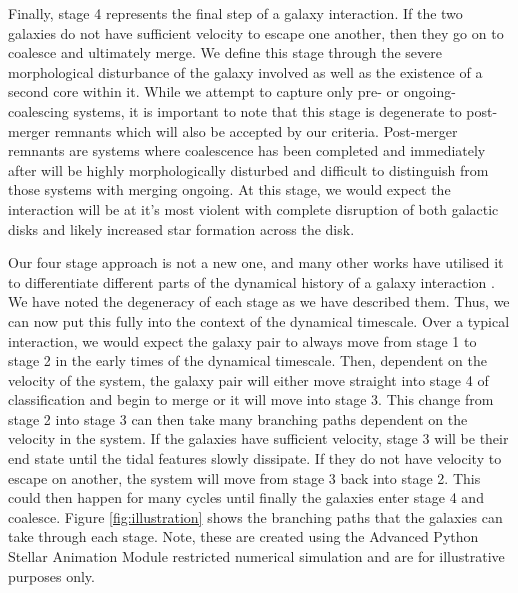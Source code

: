 \documentclass[fleqn,usenatbib]{mnras}
\begin{document}
Finally, stage 4 represents the final step of a galaxy interaction. If the two galaxies do not have sufficient velocity to escape one another, then they go on to coalesce and ultimately merge. We define this stage through the severe morphological disturbance of the galaxy involved as well as the existence of a second core within it. While we attempt to capture only pre- or ongoing-coalescing systems, it is important to note that this stage is degenerate to post-merger remnants which will also be accepted by our criteria. Post-merger remnants are systems where coalescence has been completed and immediately after will be highly morphologically disturbed and difficult to distinguish from those systems with merging ongoing. At this stage, we would expect the interaction will be at it's most violent with complete disruption of both galactic disks and likely increased star formation across the disk. 

Our four stage approach is not a new one, and many other works have utilised it to differentiate different parts of the dynamical history of a galaxy interaction \citep{2022ApJ...937...97C, 2023ApJ...952..122G}. We have noted the degeneracy of each stage as we have described them. Thus, we can now put this fully into the context of the dynamical timescale. Over a typical interaction, we would expect the galaxy pair to always move from stage 1 to stage 2 in the early times of the dynamical timescale. Then, dependent on the velocity of the system, the galaxy pair will either move straight into stage 4 of classification and begin to merge or it will move into stage 3. This change from stage 2 into stage 3 can then take many branching paths dependent on the velocity in the system. If the galaxies have sufficient velocity, stage 3 will be their end state until the tidal features slowly dissipate. If they do not have velocity to escape on another, the system will move from stage 3 back into stage 2. This could then happen for many cycles until finally the galaxies enter stage 4 and coalesce. Figure \ref{fig:illustration} shows the branching paths that the galaxies can take through each stage. Note, these are created using the Advanced Python Stellar Animation Module restricted numerical simulation \citep[][O'Ryan et al., in prep.]{2016A&C....16...26W} and are for illustrative purposes only.
\end{document}
